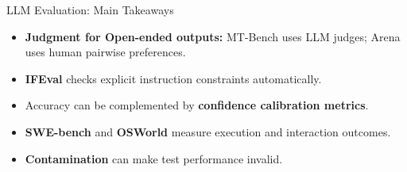 \documentclass[11pt,compress,t,notes=noshow, xcolor=table]{beamer}
\begin{document}

\begin{vbframe}{LLM Evaluation: Main Takeaways}

\begin{itemize}

    \item \textbf{Judgment for Open-ended outputs:}
    MT-Bench uses LLM judges; Arena uses human pairwise preferences.

    \item \textbf{IFEval} checks explicit instruction constraints automatically.

    \item Accuracy can be complemented by \textbf{confidence calibration metrics}.

    \item \textbf{SWE-bench} and \textbf{OSWorld} measure execution and interaction outcomes.

    \item \textbf{Contamination}
     can make test performance invalid.

\end{itemize}

\end{vbframe}

\endlecture
\end{document}
